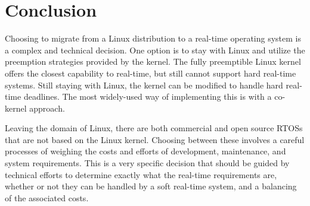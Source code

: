 \section{Conclusion}
\markboth{}{}
    Choosing to migrate from a Linux distribution to a real-time operating
        system is a complex and technical decision.
    One option is to stay with Linux and utilize the preemption strategies
        provided by the kernel.
    The fully preemptible Linux kernel offers the closest capability to
        real-time, but still cannot support hard real-time systems.
    Still staying with Linux, the kernel can be modified to handle hard
        real-time deadlines.
    The most widely-used way of implementing this is with a co-kernel approach.

    Leaving the domain of Linux, there are both commercial and open source RTOSs
        that are not based on the Linux kernel.
    Choosing between these involves a careful processes of weighing the costs
        and efforts of development, maintenance, and system requirements.
    This is a very specific decision that should be guided by technical efforts
        to determine exactly what the real-time requirements are, whether or not
        they can be handled by a soft real-time system, and a balancing of the
        associated costs.
